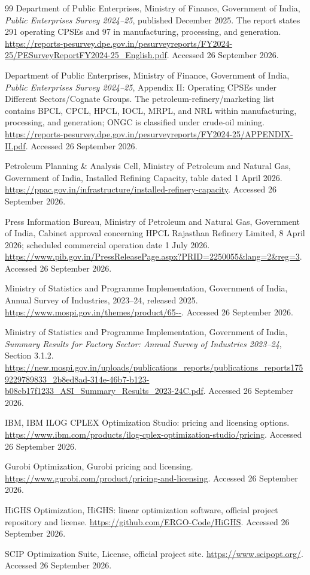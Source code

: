 \documentclass[11pt,a4paper]{article}
\begin{document}
\begin{thebibliography}{99}
Department of Public Enterprises, Ministry of Finance, Government of India,
\emph{Public Enterprises Survey 2024--25}, published December 2025.
The report states 291 operating CPSEs and 97 in manufacturing, processing, and generation.
\url{https://reports-pesurvey.dpe.gov.in/pesurveyreports/FY2024-25/PESurveyReportFY2024-25_English.pdf}.
Accessed 26 September 2026.

Department of Public Enterprises, Ministry of Finance, Government of India,
\emph{Public Enterprises Survey 2024--25}, Appendix II: Operating CPSEs under Different Sectors/Cognate Groups.
The petroleum-refinery/marketing list contains BPCL, CPCL, HPCL, IOCL, MRPL, and NRL within manufacturing, processing, and generation; ONGC is classified under crude-oil mining.
\url{https://reports-pesurvey.dpe.gov.in/pesurveyreports/FY2024-25/APPENDIX-II.pdf}.
Accessed 26 September 2026.

Petroleum Planning \& Analysis Cell, Ministry of Petroleum and Natural Gas, Government of India,
Installed Refining Capacity, table dated 1 April 2026.
\url{https://ppac.gov.in/infrastructure/installed-refinery-capacity}.
Accessed 26 September 2026.

Press Information Bureau, Ministry of Petroleum and Natural Gas, Government of India,
Cabinet approval concerning HPCL Rajasthan Refinery Limited, 8 April 2026; scheduled commercial operation date 1 July 2026.
\url{https://www.pib.gov.in/PressReleasePage.aspx?PRID=2250055&lang=2&reg=3}.
Accessed 26 September 2026.

Ministry of Statistics and Programme Implementation, Government of India,
Annual Survey of Industries, 2023--24, released 2025.
\url{https://www.mospi.gov.in/themes/product/65--}.
Accessed 26 September 2026.

Ministry of Statistics and Programme Implementation, Government of India,
\emph{Summary Results for Factory Sector: Annual Survey of Industries 2023--24}, Section 3.1.2.
\url{https://new.mospi.gov.in/uploads/publications_reports/publications_reports1759229789833_2b8ed8ad-314e-46b7-b123-b08cb17f1233_ASI_Summary_Results_2023-24C.pdf}.
Accessed 26 September 2026.

IBM,
IBM ILOG CPLEX Optimization Studio: pricing and licensing options.
\url{https://www.ibm.com/products/ilog-cplex-optimization-studio/pricing}.
Accessed 26 September 2026.

Gurobi Optimization,
Gurobi pricing and licensing.
\url{https://www.gurobi.com/product/pricing-and-licensing}.
Accessed 26 September 2026.

HiGHS Optimization,
HiGHS: linear optimization software, official project repository and license.
\url{https://github.com/ERGO-Code/HiGHS}.
Accessed 26 September 2026.

SCIP Optimization Suite,
License, official project site.
\url{https://www.scipopt.org/}.
Accessed 26 September 2026.
\end{thebibliography}
\end{document}
